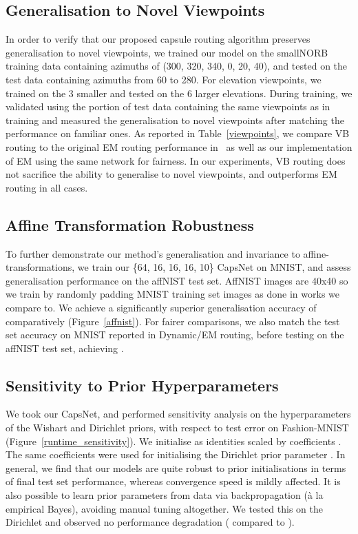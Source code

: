 \documentclass[letterpaper]{article} \usepackage{aaai20}  \usepackage{times}  \usepackage{helvet} \usepackage{courier}  \usepackage[hyphens]{url}  \usepackage{graphicx} \urlstyle{rm} \def\UrlFont{\rm}  \usepackage{graphicx}  \frenchspacing  \setlength{\pdfpagewidth}{8.5in}  \setlength{\pdfpageheight}{11in}  \nocopyright
\begin{document}
\subsection{Generalisation to Novel Viewpoints}
In order to verify that our proposed capsule routing algorithm preserves generalisation to novel viewpoints, we trained our  model on the smallNORB training data containing azimuths of (300, 320, 340, 0, 20, 40), and tested on the test data containing azimuths from 60 to 280. For elevation viewpoints, we trained on the 3 smaller and tested on the 6 larger elevations. During training, we validated using the portion of test data containing the same viewpoints as in training and measured the generalisation to novel viewpoints after matching the performance on familiar ones. As reported in Table~\ref{viewpoints}, we compare VB routing to the original EM routing performance in~\cite{hinton2018matrix} as well as our implementation of EM using the same network for fairness. In our experiments, VB routing does not sacrifice the ability to generalise to novel viewpoints, and outperforms EM routing in all cases.
\subsection{Affine Transformation Robustness}
To further demonstrate our method’s generalisation and invariance to affine-transformations, we train our \{64, 16, 16, 16, 10\} CapsNet on MNIST, and assess generalisation performance on the affNIST test set. AffNIST images are 40x40 so we train by randomly padding MNIST training set images as done in works we compare to. We achieve a significantly superior generalisation accuracy of  comparatively (Figure~\ref{affnist}). For fairer comparisons, we also match the  test set accuracy on MNIST reported in Dynamic/EM routing, before testing on the affNIST test set, achieving .
\subsection{Sensitivity to Prior Hyperparameters}
\label{priors}
We took our  CapsNet, and performed sensitivity analysis on the hyperparameters of the Wishart and Dirichlet priors, with respect to test error on Fashion-MNIST (Figure~\ref{runtime_sensitivity}). We initialise  as identities scaled by coefficients . The same coefficients were used for initialising the Dirichlet prior parameter . In general, we find that our models are quite robust to prior initialisations in terms of final test set performance, whereas convergence speed is mildly affected. It is also possible to learn prior parameters from data via backpropagation (à la empirical Bayes), avoiding manual tuning altogether. We tested this on the Dirichlet  and observed no performance degradation ( compared to ).
\end{document}
